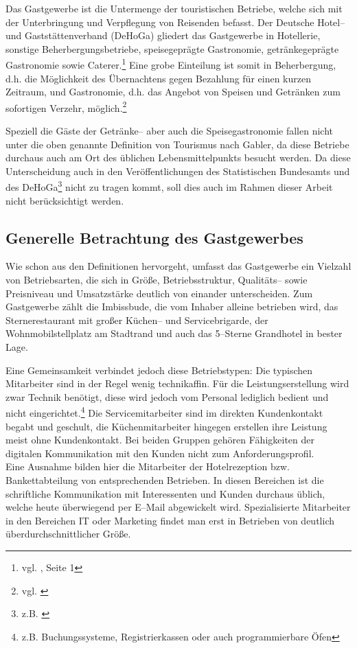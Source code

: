 Das Gastgewerbe ist die Untermenge der touristischen Betriebe, welche sich mit der Unterbringung und Verpflegung von Reisenden befasst. Der Deutsche Hotel– und Gaststättenverband (\ac{DeHoGa}) gliedert das Gastgewerbe in Hotellerie, sonstige Beherbergungsbetriebe, speisegeprägte Gastronomie, getränkegeprägte Gastronomie sowie Caterer.\footnote{vgl. \cite{dehoga:zahlenspiegel}, Seite 1} Eine grobe Einteilung ist somit in Beherbergung, d.h. die Möglichkeit des Übernachtens gegen Bezahlung für einen kurzen Zeitraum, und Gastronomie, d.h. das Angebot von Speisen und Getränken zum sofortigen Verzehr, möglich.\footnote{vgl. \cite{destatis:gastgewerbe}}

Speziell die Gäste der Getränke-- aber auch die Speisegastronomie fallen nicht unter die oben genannte Definition von Tourismus nach Gabler, da diese Betriebe durchaus auch am Ort des üblichen Lebensmittelpunkts besucht werden. Da diese Unterscheidung auch in den Veröffentlichungen des Statistischen Bundesamts und des \ac{DeHoGa}\footnote{z.B. \cite{dehoga:zahlenspiegel}} nicht zu tragen kommt, soll dies auch im Rahmen dieser Arbeit nicht berücksichtigt werden.

\subsection{Generelle Betrachtung des Gastgewerbes} %
\label{sec:generelltouri}
Wie schon aus den Definitionen hervorgeht, umfasst das Gastgewerbe ein Vielzahl von Betriebsarten, die sich in Größe, Betriebsstruktur, Qualitäts– sowie Preisniveau und Umsatzstärke deutlich von einander unterscheiden. Zum Gastgewerbe zählt die Imbissbude, die vom Inhaber alleine betrieben wird, das Sternerestaurant mit großer Küchen– und Servicebrigarde, der Wohnmobilstellplatz am Stadtrand und auch das 5–Sterne Grandhotel in bester Lage.

Eine Gemeinsamkeit verbindet jedoch diese Betriebstypen: Die typischen Mitarbeiter sind in der Regel wenig technikaffin. Für die Leistungserstellung wird zwar Technik benötigt, diese wird jedoch vom Personal lediglich bedient und nicht eingerichtet.\footnote{z.B. Buchungssysteme, Registrierkassen oder auch programmierbare Öfen} Die Servicemitarbeiter sind im direkten Kundenkontakt begabt und geschult, die Küchenmitarbeiter hingegen erstellen ihre Leistung meist ohne Kundenkontakt. Bei beiden Gruppen gehören Fähigkeiten der digitalen Kommunikation mit den Kunden nicht zum Anforderungsprofil.\\
Eine Ausnahme bilden hier die Mitarbeiter der Hotelrezeption bzw. Bankettabteilung von entsprechenden Betrieben. In diesen Bereichen ist die schriftliche Kommunikation mit Interessenten und Kunden durchaus üblich, welche heute überwiegend per E–Mail abgewickelt wird. 
Spezialisierte Mitarbeiter in den Bereichen IT oder Marketing findet man erst in Betrieben von deutlich überdurchschnittlicher Größe. 


